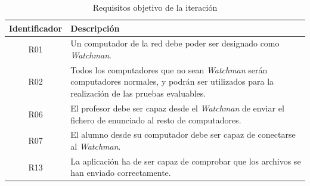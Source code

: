 \begin{table}
    \begin{tabular}{|c|p{10cm}|}
        \hline
        \textbf{Identificador} & \textbf{Descripción}
        \\ \hline

        R01 & Un computador de la red debe poder ser designado como \emph{Watchman}.
        \\ \hline

        R02 & Todos los computadores que no sean \emph{Watchman} serán computadores
        normales, y podrán ser utilizados para la realización de las pruebas evaluables.
        \\ \hline

        R06 & El profesor debe ser capaz desde el \emph{Watchman} de enviar el fichero de enunciado al resto de computadores.
        \\ \hline

        R07 & El alumno desde su computador debe ser capaz de conectarse al \emph{Watchman}.
        \\ \hline

        R13 & La aplicación ha de ser capaz de comprobar que los archivos se han enviado correctamente.
        \\ \hline

    \end{tabular}
    \caption{Requisitos objetivo de la iteración}
    \label{tabla:iteracion1:requisitosObjetivo}
\end{table}


